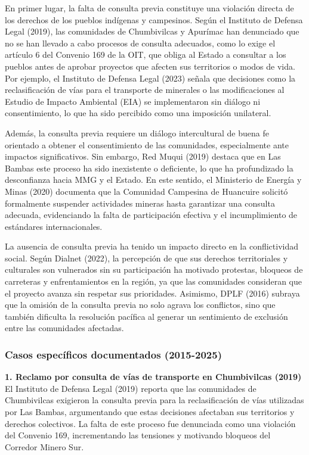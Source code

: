 \documentclass[
  stu,
  floatsintext,
  longtable,
  a4paper,
  nolmodern,
  notxfonts,
  notimes,
  colorlinks=true,linkcolor=blue,citecolor=blue,urlcolor=blue]{apa7}
\begin{document}
En primer lugar, la falta de consulta previa constituye una violación
directa de los derechos de los pueblos indígenas y campesinos. Según el
Instituto de Defensa Legal (2019), las comunidades de Chumbivilcas y
Apurímac han denunciado que no se han llevado a cabo procesos de
consulta adecuados, como lo exige el artículo 6 del Convenio 169 de la
OIT, que obliga al Estado a consultar a los pueblos antes de aprobar
proyectos que afecten sus territorios o modos de vida. Por ejemplo, el
Instituto de Defensa Legal (2023) señala que decisiones como la
reclasificación de vías para el transporte de minerales o las
modificaciones al Estudio de Impacto Ambiental (EIA) se implementaron
sin diálogo ni consentimiento, lo que ha sido percibido como una
imposición unilateral.

Además, la consulta previa requiere un diálogo intercultural de buena fe
orientado a obtener el consentimiento de las comunidades, especialmente
ante impactos significativos. Sin embargo, Red Muqui (2019) destaca que
en Las Bambas este proceso ha sido inexistente o deficiente, lo que ha
profundizado la desconfianza hacia MMG y el Estado. En este sentido, el
Ministerio de Energía y Minas (2020) documenta que la Comunidad
Campesina de Huancuire solicitó formalmente suspender actividades
mineras hasta garantizar una consulta adecuada, evidenciando la falta de
participación efectiva y el incumplimiento de estándares
internacionales.

La ausencia de consulta previa ha tenido un impacto directo en la
conflictividad social. Según Dialnet (2022), la percepción de que sus
derechos territoriales y culturales son vulnerados sin su participación
ha motivado protestas, bloqueos de carreteras y enfrentamientos en la
región, ya que las comunidades consideran que el proyecto avanza sin
respetar sus prioridades. Asimismo, DPLF (2016) subraya que la omisión
de la consulta previa no solo agrava los conflictos, sino que también
dificulta la resolución pacífica al generar un sentimiento de exclusión
entre las comunidades afectadas.

\subsubsection{Casos específicos documentados
(2015-2025)}\label{casos-especuxedficos-documentados-2015-2025}

\textbf{1. Reclamo por consulta de vías de transporte en Chumbivilcas
(2019)} El Instituto de Defensa Legal (2019) reporta que las comunidades
de Chumbivilcas exigieron la consulta previa para la reclasificación de
vías utilizadas por Las Bambas, argumentando que estas decisiones
afectaban sus territorios y derechos colectivos. La falta de este
proceso fue denunciada como una violación del Convenio 169,
incrementando las tensiones y motivando bloqueos del Corredor Minero
Sur.
\end{document}
